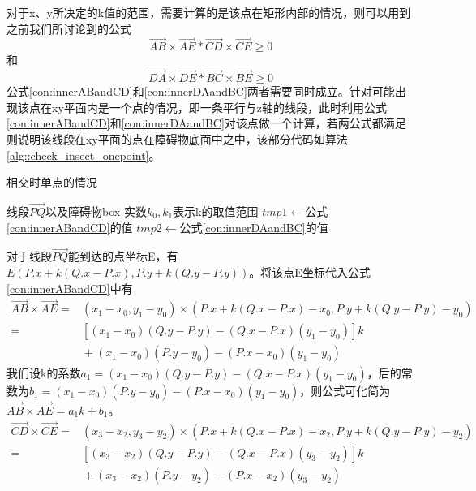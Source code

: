 对于x、y所决定的k值的范围，需要计算的是该点在矩形内部的情况，则可以用到之前我们所讨论到的公式
\begin{equation}
    \vec{AB}\times\vec{AE}*\vec{CD}\times\vec{CE}\ge 0
\label{con:innerABandCD}
\end{equation}
和
\begin{equation}
    \vec{DA}\times\vec{DE}*\vec{BC}\times\vec{BE}\ge 0
\label{con:innerDAandBC}
\end{equation}
公式\ref{con:innerABandCD}和\ref{con:innerDAandBC}两者需要同时成立。针对可能出现该点在xy平面内是一个点的情况，即一条平行与z轴的线段，此时利用公式\ref{con:innerABandCD}和\ref{con:innerDAandBC}对该点做一个计算，若两公式都满足则说明该线段在xy平面的点在障碍物底面中之中，该部分代码如算法\ref{alg::check_insect_onepoint}。
%
\begin{algorithm}[!htb]
    \caption{相交时单点的情况}
    \label{alg::check_insect_onepoint}
    \begin{algorithmic}[1]
        \Require 线段$\vec{PQ}$以及障碍物box
        \Ensure 实数$k_0,k_1$表示k的取值范围
            \State $tmp1 \gets$公式\ref{con:innerABandCD}的值
            \State $tmp2 \gets$公式\ref{con:innerDAandBC}的值
                \State {}
            \Else
                \State {}
            \EndIf
        \EndFunction
    \end{algorithmic}
\end{algorithm}
对于线段$\vec{PQ}$能到达的点坐标E，有$E(P.x+k(Q.x-P.x),P.y+k(Q.y-P.y))$。将该点E坐标代入公式\ref{con:innerABandCD}中有
\begin{align*} 
    \vec{AB}\times\vec{AE} = {}& (x_1-x_0,y_1-y_0)\times(P.x+k(Q.x-P.x)-x_0,P.y+k(Q.y-P.y)-y_0) \\ 
    = {}& [(x_1-x_0)(Q.y-P.y)-(Q.x-P.x)(y_1-y_0)]k  \\ 
    &{} +(x_1-x_0)(P.y-y_0)-(P.x-x_0)(y_1-y_0) 
\end{align*}
我们设k的系数$a_1=(x_1-x_0)(Q.y-P.y)-(Q.x-P.x)(y_1-y_0)$，后的常数为$b_1=(x_1-x_0)(P.y-y_0)-(P.x-x_0)(y_1-y_0)$，则公式可化简为$\vec{AB}\times\vec{AE} = a_1k+b_1$。
\begin{align*} 
    \vec{CD}\times\vec{CE} = {}& (x_3-x_2,y_3-y_2)\times(P.x+k(Q.x-P.x)-x_2,P.y+k(Q.y-P.y)-y_2) \\ 
    = {}& [(x_3-x_2)(Q.y-P.y)-(Q.x-P.x)(y_3-y_2)]k  \\ 
    &{} +(x_3-x_2)(P.y-y_2)-(P.x-x_2)(y_3-y_2) 
\end{align*}
